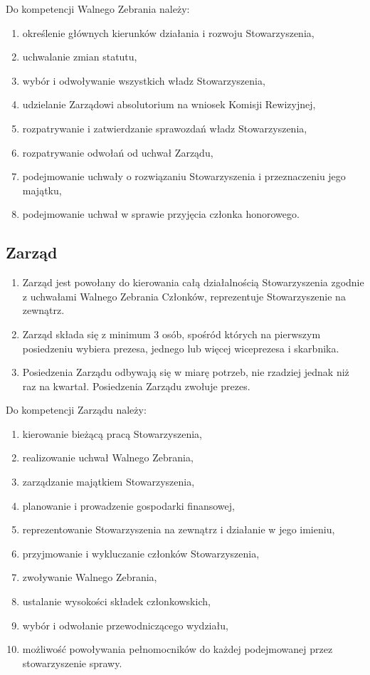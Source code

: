 \documentclass{article}
\begin{document}
Do kompetencji Walnego Zebrania należy:
\begin{enumerate}
\item
  określenie głównych kierunków działania i rozwoju Stowarzyszenia,
\item
  uchwalanie zmian statutu,
\item
  wybór i odwoływanie wszystkich władz Stowarzyszenia,
\item
  udzielanie Zarządowi absolutorium na wniosek Komisji Rewizyjnej,
\item
  rozpatrywanie i zatwierdzanie sprawozdań władz Stowarzyszenia,
\item
  rozpatrywanie odwołań od uchwał Zarządu,
\item
  podejmowanie uchwały o rozwiązaniu Stowarzyszenia i przeznaczeniu jego majątku,
\item
  podejmowanie uchwał w sprawie przyjęcia członka honorowego.
\end{enumerate}

\subsection*{Zarząd}
\begin{enumerate}
\item
  Zarząd jest powołany do kierowania całą działalnością Stowarzyszenia zgodnie z uchwałami Walnego Zebrania Członków, reprezentuje Stowarzyszenie na zewnątrz.
\item
  Zarząd składa się z minimum 3 osób, spośród których na pierwszym posiedzeniu wybiera prezesa, jednego lub więcej wiceprezesa i skarbnika.
\item
  Posiedzenia Zarządu odbywają się w miarę potrzeb, nie rzadziej jednak niż raz na kwartał. Posiedzenia Zarządu zwołuje prezes.
\end{enumerate}

Do kompetencji Zarządu należy:
\begin{enumerate}
\item
  kierowanie bieżącą pracą Stowarzyszenia,
\item
  realizowanie uchwał Walnego Zebrania,
\item
  zarządzanie majątkiem Stowarzyszenia,
\item
  planowanie i prowadzenie gospodarki finansowej,
\item
  reprezentowanie Stowarzyszenia na zewnątrz i działanie w jego imieniu,
\item
  przyjmowanie i wykluczanie członków Stowarzyszenia,
\item
  zwoływanie Walnego Zebrania,
\item
  ustalanie wysokości składek członkowskich,
\item
  wybór i odwołanie przewodniczącego wydziału,
\item
  możliwość powoływania pełnomocników do każdej podejmowanej przez stowarzyszenie sprawy.
\end{enumerate}
\end{document}
